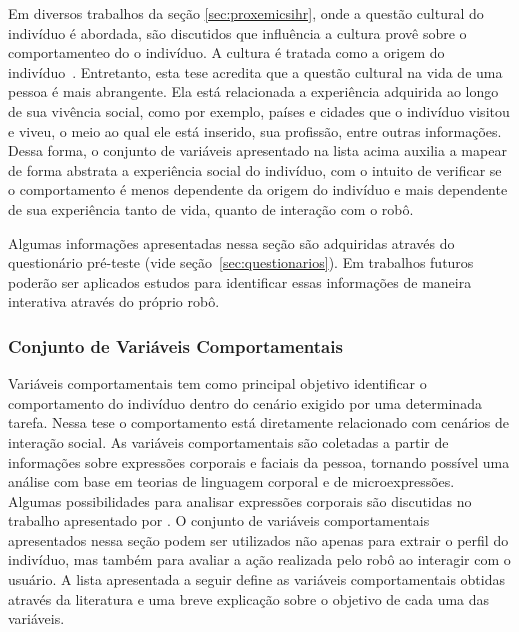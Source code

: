 Em diversos trabalhos da seção \ref{sec:proxemicsihr}, onde a questão cultural do indivíduo é abordada, são discutidos que influência a cultura provê sobre o comportamenteo do o indivíduo. A cultura é tratada como a origem do indivíduo~\cite{eresha:2013}. Entretanto, esta tese acredita que a questão cultural na vida de uma pessoa é mais abrangente. Ela está relacionada a experiência adquirida ao longo de sua vivência social, como por exemplo, países e cidades que o indivíduo visitou e viveu, o meio ao qual ele está inserido, sua profissão, entre outras informações. Dessa forma, o conjunto de variáveis apresentado na lista acima auxilia a mapear de forma abstrata a experiência social do indivíduo, com o intuito de verificar se o comportamento é menos dependente da origem do indivíduo e mais dependente de sua experiência tanto de vida, quanto de interação com o robô.

Algumas informações apresentadas nessa seção são adquiridas através do questionário pré-teste (vide seção~\ref{sec:questionarios}). Em trabalhos futuros poderão ser aplicados estudos para identificar essas informações de maneira interativa através do próprio robô.

\subsubsection{Conjunto de Variáveis Comportamentais}
\label{sec:variaveiscomportamentais}

Variáveis comportamentais tem como principal objetivo identificar o comportamento do indivíduo dentro do cenário exigido por uma determinada tarefa. Nessa tese o comportamento está diretamente relacionado com cenários de interação social. As variáveis comportamentais são coletadas a partir de informações sobre expressões corporais e faciais da pessoa, tornando possível uma análise com base em teorias de linguagem corporal e de microexpressões. Algumas possibilidades para analisar expressões corporais são discutidas no trabalho apresentado por . O conjunto de variáveis comportamentais apresentados nessa seção podem ser utilizados não apenas para extrair o perfil do indivíduo, mas também para avaliar a ação realizada pelo robô ao interagir com o usuário. A lista apresentada a seguir define as variáveis comportamentais obtidas através da literatura e uma breve explicação sobre o objetivo de cada uma das variáveis.

